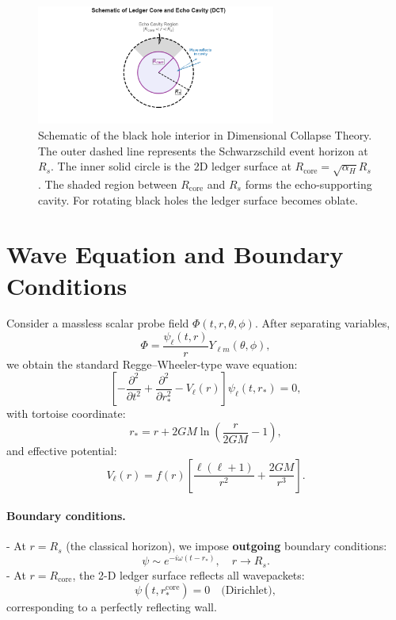 \documentclass[a4paper, 12pt, oneside]{book}
\numberwithin{equation}{chapter}
\begin{document}
\begin{figure}[htbp]
    \centering
    \includegraphics[width=0.7\textwidth]{figures/cavity_schematic.pdf} 
    \caption[Schematic of the black hole interior in Dimensional Collapse Theory]{Schematic of the black hole interior in Dimensional Collapse Theory. The outer dashed line represents the Schwarzschild event horizon at $R_s$. The inner solid circle is the 2D ledger surface at $R_{\text{core}} = \sqrt{\alpha_H} R_s$. The shaded region between $R_{\text{core}}$ and $R_s$ forms the echo-supporting cavity. For rotating black holes the ledger surface becomes oblate.}
    \label{fig:cavity_schematic}
\end{figure}

\section{Wave Equation and Boundary Conditions}
\label{sec:WaveEquation}

Consider a massless scalar probe field \( \Phi(t, r, \theta, \phi) \). After separating variables,
\[
    \Phi = \frac{\psi_\ell(t,r)}{r} Y_{\ell m}(\theta, \phi),
\]
we obtain the standard Regge–Wheeler-type wave equation:
\[
    \left[
        -\frac{\partial^2}{\partial t^2}
        + \frac{\partial^2}{\partial r_*^2}
        - V_\ell(r)
    \right]
    \psi_\ell(t, r_*) = 0,
\]
with tortoise coordinate:
\[
    r_* = r + 2GM \ln\left( \frac{r}{2GM} - 1 \right),
\]
and effective potential:
\[
    V_\ell(r) = f(r) \left[
        \frac{\ell(\ell+1)}{r^2} + \frac{2GM}{r^3}
    \right].
\]

\paragraph{Boundary conditions.}

- At \( r = R_s \) (the classical horizon), we impose \textbf{outgoing} boundary conditions:
  \[
      \psi \sim e^{-i\omega(t - r_*)},\quad r\to R_s.
  \]
- At \( r = R_{\text{core}} \), the 2-D ledger surface reflects all wavepackets:
  \[
      \psi(t, r_*^{\text{core}}) = 0 \quad\text{(Dirichlet)},
  \]
  corresponding to a perfectly reflecting wall.
\end{document}
